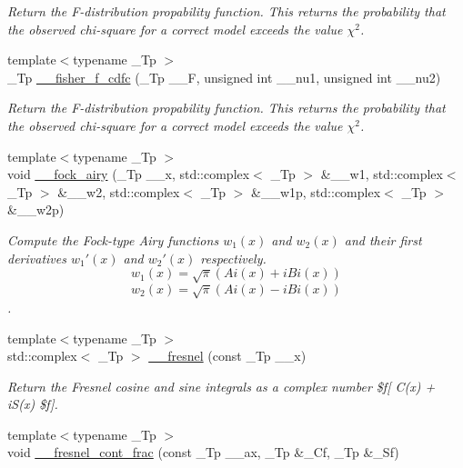 \begin{DoxyCompactItemize}
\begin{DoxyCompactList}\small\item\em Return the F-\/distribution propability function. This returns the probability that the observed chi-\/square for a correct model exceeds the value $ \chi^2 $. \end{DoxyCompactList}\item 
{\footnotesize template$<$typename \+\_\+\+Tp $>$ }\\\+\_\+\+Tp \hyperlink{namespacestd_1_1____detail_ae02418cde6461a9e65f926c974c216a2}{\+\_\+\+\_\+fisher\+\_\+f\+\_\+cdfc} (\+\_\+\+Tp \+\_\+\+\_\+F, unsigned int \+\_\+\+\_\+nu1, unsigned int \+\_\+\+\_\+nu2)
\begin{DoxyCompactList}\small\item\em Return the F-\/distribution propability function. This returns the probability that the observed chi-\/square for a correct model exceeds the value $ \chi^2 $. \end{DoxyCompactList}\item 
{\footnotesize template$<$typename \+\_\+\+Tp $>$ }\\void \hyperlink{namespacestd_1_1____detail_a96ccd15b0c375170be157136faa47387}{\+\_\+\+\_\+fock\+\_\+airy} (\+\_\+\+Tp \+\_\+\+\_\+x, std\+::complex$<$ \+\_\+\+Tp $>$ \&\+\_\+\+\_\+w1, std\+::complex$<$ \+\_\+\+Tp $>$ \&\+\_\+\+\_\+w2, std\+::complex$<$ \+\_\+\+Tp $>$ \&\+\_\+\+\_\+w1p, std\+::complex$<$ \+\_\+\+Tp $>$ \&\+\_\+\+\_\+w2p)
\begin{DoxyCompactList}\small\item\em Compute the Fock-\/type Airy functions $ w_1(x) $ and $ w_2(x) $ and their first derivatives $ w_1'(x) $ and $ w_2'(x) $ respectively. \[ w_1(x) = \sqrt{\pi}(Ai(x) + iBi(x)) \] \[ w_2(x) = \sqrt{\pi}(Ai(x) - iBi(x)) \]. \end{DoxyCompactList}\item 
{\footnotesize template$<$typename \+\_\+\+Tp $>$ }\\std\+::complex$<$ \+\_\+\+Tp $>$ \hyperlink{namespacestd_1_1____detail_a322045015cfbde5a45e7718d533de60d}{\+\_\+\+\_\+fresnel} (const \+\_\+\+Tp \+\_\+\+\_\+x)
\begin{DoxyCompactList}\small\item\em Return the Fresnel cosine and sine integrals as a complex number \$f\mbox{[} C(x) + i\+S(x) \$f\mbox{]}. \end{DoxyCompactList}\item 
{\footnotesize template$<$typename \+\_\+\+Tp $>$ }\\void \hyperlink{namespacestd_1_1____detail_aeae8420e2fa1671f004066525adc99b6}{\+\_\+\+\_\+fresnel\+\_\+cont\+\_\+frac} (const \+\_\+\+Tp \+\_\+\+\_\+ax, \+\_\+\+Tp \&\+\_\+\+Cf, \+\_\+\+Tp \&\+\_\+\+Sf)

\end{DoxyCompactItemize}
